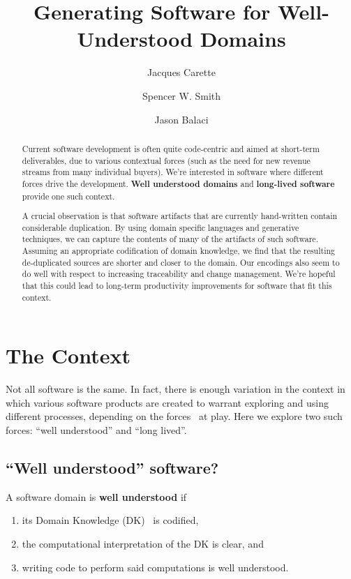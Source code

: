 \documentclass[a4paper,UKenglish,cleveref,autoref,thm-restate]{oasics-v2021}
\title{Generating Software for Well-Understood Domains}
\author{Jacques Carette}{Department of Computing and Software, McMaster University, 1280 Main Street West, Hamilton, Ontario, L8S 4L8, Canada \and \url{https://www.cas.mcmaster.ca/~carette/} }{carette@mcmaster.ca}{https://orcid.org/0000-0001-8993-9804}{}
\author{Spencer W. Smith}{Department of Computing and Software, McMaster University, 1280 Main Street West, Hamilton, Ontario, L8S 4L8, Canada \and \url{https://www.cas.mcmaster.ca/~smiths/} }{smiths@mcmaster.ca}{https://orcid.org/0000-0002-0760-0987}{}
\author{Jason Balaci}{Department of Computing and Software, McMaster University, 1280 Main Street West, Hamilton, Ontario, L8S 4L8, Canada}{balacij@mcmaster.ca}{}{}
\begin{document}
\maketitle

\begin{abstract}
    Current software development is often quite code-centric and aimed at
    short-term deliverables, due to various contextual forces (such as the
    need for new revenue streams from many individual buyers). We're interested
    in software where different forces drive the development. \textbf{Well
    understood domains} and \textbf{long-lived software} provide one such
    context.

    A crucial observation is that software artifacts that are currently
    hand-written contain considerable duplication.  By using domain specific
    languages and generative techniques, we can capture the contents of many of
    the artifacts of such software.  Assuming an appropriate codification of
    domain knowledge, we find that the resulting de-duplicated sources are
    shorter and closer to the domain.  Our encodings also seem to do well with
    respect to increasing traceability and change management. We're hopeful
    that this could lead to long-term productivity improvements for software
    that fit this context.
\end{abstract}

\section{The Context}
\label{sec:the-context}

Not all software is the same. In fact, there is enough variation in the
context in which various software products are created to warrant exploring and
using different processes, depending on the forces~\cite{alexander1977pattern}
at play. Here we explore two such forces: ``well understood'' and ``long
lived''.

\subsection{``Well understood'' software?}
\label{subsec:well-understood}

\begin{definition}
\label{defn:well-understood}
A software domain is \textbf{well understood} if
\begin{enumerate}
    \item its Domain Knowledge (DK)~\cite{bjorner2021domaineng} is codified,
    \item the computational interpretation of the DK is clear, and
    \item writing code to perform said computations is well understood.
\end{enumerate}
\end{definition}
\end{document}
